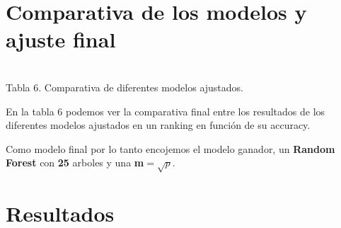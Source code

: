 \documentclass{article}
\begin{document}
\section{Comparativa de los modelos y ajuste final}

\begin{table}[H]
\centering
{}
  \footnotesize{~\\ Tabla 6. Comparativa de diferentes modelos ajustados.}
\end{table}

En la tabla 6 podemos ver la comparativa final entre los resultados de los diferentes modelos ajustados en un ranking en función de su accuracy.

Como modelo final por lo tanto encojemos el modelo ganador, un \textbf{Random Forest} con \textbf{25} arboles y una \textbf{m}$=\sqrt{p}$.


\section{Resultados}
\end{document}
